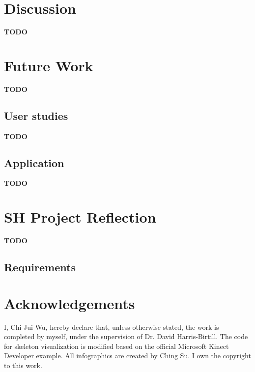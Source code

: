 \documentclass{sigchi}
\begin{document}
\section{Discussion}

\textbf{TODO}

\section{Future Work}
\label{sec:future_work}

\textbf{TODO}

\subsection{User studies}

\textbf{TODO}

\subsection{Application}

\textbf{TODO}

\section{SH Project Reflection}

\textbf{TODO}

\subsection{Requirements}

\section{Acknowledgements}
\label{sec:acknowledge}

I, Chi-Jui Wu, hereby declare that, unless otherwise stated, the work is completed by myself, under the supervision of Dr. David Harris-Birtill. The code for skeleton visualization is modified based on the official Microsoft Kinect Developer example.
All infographics are created by Ching Su. I own the copyright to this work.

\balance{}



\end{document}
